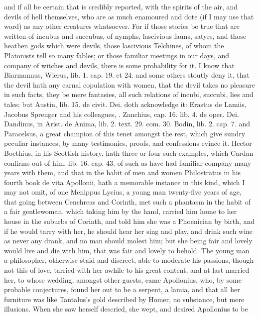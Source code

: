 {and if all be certain that is credibly reported, with the spirits of
the air, and devils of hell themselves, who are as much enamoured and
dote (if I may use that word) as any other creatures whatsoever. For if
those stories be true that are written of incubus and succubus, of
nymphs, lascivious fauns, satyrs, and those heathen gods which were
devils, those lascivious Telchines, of whom the Platonists tell so many
fables; or those familiar meetings in our days, and company of witches
and devils, there is some probability for it. I know that Biarmannus,
Wierus, lib. 1. cap. 19. et 24. and some others stoutly deny it, that
the devil hath any carnal copulation with women, that the devil takes
no pleasure in such facts, they be mere fantasies, all such relations
of incubi, succubi, lies and tales; but Austin, lib. 15. de civit. Dei.
doth acknowledge it: Erastus de Lamiis, Jacobus Sprenger and his
colleagues, \etc{}.  Zanchius, cap. 16. lib. 4. de oper. Dei.
Dandinus, in Arist. de Anima, lib. 2. text. 29. com. 30. Bodin, lib. 2.
cap. 7. and Paracelsus, a great champion of this tenet amongst the
rest, which give sundry peculiar instances, by many testimonies,
proofs, and confessions evince it. Hector Boethius, in his Scottish
history, hath three or four such examples, which Cardan confirms out of
him, lib. 16. cap. 43. of such as have had familiar company many years
with them, and that in the habit of men and women Philostratus in his
fourth book de vita Apollonii, hath a memorable instance in this kind,
which I may not omit, of one Menippus Lycius, a young man twenty-five
years of age, that going between Cenchreas and Corinth, met such a
phantasm in the habit of a fair gentlewoman, which taking him by the
hand, carried him home to her house in the suburbs of Corinth, and told
him she was a Phoenician by birth, and if he would tarry with her,
he should hear her sing and play, and drink such wine as never
any drank, and no man should molest him; but she being fair and lovely
would live and die with him, that was fair and lovely to behold. The
young man a philosopher, otherwise staid and discreet, able to moderate
his passions, though not this of love, tarried with her awhile to his
great content, and at last married her, to whose wedding, amongst other
guests, came Apollonius, who, by some probable conjectures, found her
out to be a serpent, a lamia, and that all her furniture was like
Tantalus's gold described by Homer, no substance, but mere illusions.
When she saw herself descried, she wept, and desired Apollonius to be
}
